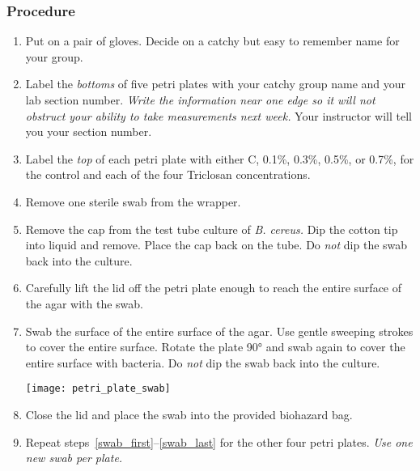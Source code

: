 \documentclass[12pt]{exam}
\begin{document}
\begin{questions}
\begin{itemize}
\end{itemize}

\subsubsection*{Procedure}

	\begin{enumerate}
	
		\item Put on a pair of gloves. Decide on a catchy but easy to remember name for your group.  
			
		\item Label the \emph{bottoms} of five petri plates with your catchy group name and your lab section number. \emph{Write the information near one edge so it will not obstruct your ability to take measurements next week.} Your instructor will tell you your section number.
		
		\item Label the \emph{top} of each petri plate with either C, 0.1\%, 0.3\%, 0.5\%, or 0.7\%, for the control and each of the four Triclosan concentrations. 
		
		\item \label{swab_first} Remove one sterile swab from the wrapper. 
		
		\item Remove the cap from the test tube culture of \textit{B. cereus.} Dip the cotton tip into liquid and remove. Place the cap back on the tube. Do \emph{not} dip the swab back into the culture.
		
		\item Carefully lift the lid off the petri plate enough to reach the entire surface of the agar with the swab.
		
		\item Swab the surface of the entire surface of the agar. Use gentle sweeping strokes to cover the entire surface. Rotate the plate 90° and swab again to cover the entire surface with bacteria. Do \emph{not} dip the swab back into the culture.
		
		{\centering\texttt{[image: petri\_plate\_swab]}\par
		}
		
		\item \label{swab_last} Close the lid and place the swab into the provided biohazard bag.
		
		\item Repeat steps~\ref{swab_first}–\ref{swab_last} for the other four petri plates. \emph{Use one new swab per plate.}
		

\end{enumerate}
\end{questions}
\end{document}
